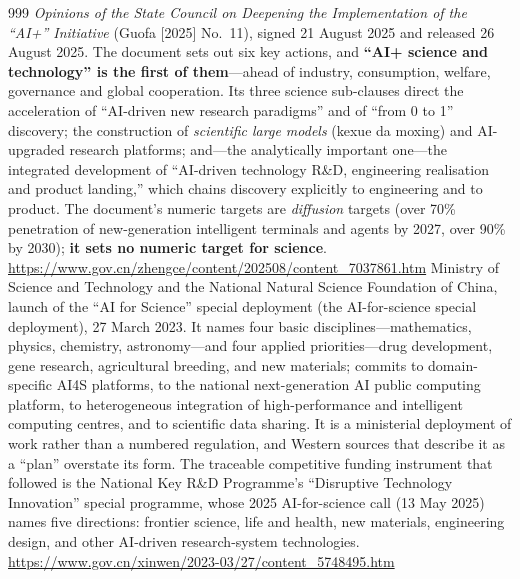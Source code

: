 \begin{thebibliography}{999}
 \emph{Opinions of the State Council on Deepening the Implementation of the ``AI+'' Initiative} (Guofa [2025] No.~11), signed 21 August 2025 and released 26 August 2025. The document sets out six key actions, and \textbf{``AI+ science and technology'' is the first of them}---ahead of industry, consumption, welfare, governance and global cooperation. Its three science sub-clauses direct the acceleration of ``AI-driven new research paradigms'' and of ``from 0 to 1'' discovery; the construction of \emph{scientific large models} (kexue da moxing) and AI-upgraded research platforms; and---the analytically important one---the integrated development of ``AI-driven technology R\&D, engineering realisation and product landing,'' which chains discovery explicitly to engineering and to product. The document's numeric targets are \emph{diffusion} targets (over 70\% penetration of new-generation intelligent terminals and agents by 2027, over 90\% by 2030); \textbf{it sets no numeric target for science}. \url{https://www.gov.cn/zhengce/content/202508/content_7037861.htm}
 Ministry of Science and Technology and the National Natural Science Foundation of China, launch of the ``AI for Science'' special deployment (the AI-for-science special deployment), 27 March 2023. It names four basic disciplines---mathematics, physics, chemistry, astronomy---and four applied priorities---drug development, gene research, agricultural breeding, and new materials; commits to domain-specific AI4S platforms, to the national next-generation AI public computing platform, to heterogeneous integration of high-performance and intelligent computing centres, and to scientific data sharing. It is a ministerial deployment of work rather than a numbered regulation, and Western sources that describe it as a ``plan'' overstate its form. The traceable competitive funding instrument that followed is the National Key R\&D Programme's ``Disruptive Technology Innovation'' special programme, whose 2025 AI-for-science call (13 May 2025) names five directions: frontier science, life and health, new materials, engineering design, and other AI-driven research-system technologies. \url{https://www.gov.cn/xinwen/2023-03/27/content_5748495.htm}

\end{thebibliography}
